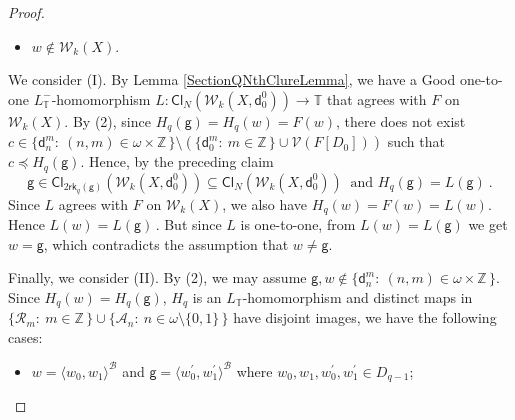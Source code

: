 \documentclass[10pt,a4paper, openany,  oldfontcommands]{memoir}
\newtheorem{open problem} [theorem] {Open Problem}
\newtheorem{open question} [theorem] {Open Question}
\begin{document}
\begin{proof}
\begin{itemize}
\item[(II)]   $  w    \not\in  \mathcal{W}_k  \left( X  \right)  $. 
\end{itemize} 
We consider (I). 
By Lemma    \ref{SectionQNthClureLemma}, 
we have a  \textsf{Good}   one-to-one  $  L_{  \mathbb{T} }^- $-homomorphism   
 $L  :    \mathsf{Cl}_N  \left(    \mathcal{W}_k  \left( X    ,  \mathsf{d}^0_0   \right)    \right)  \to  \mathbb{T} $ 
 that agrees with $F$ on   $  \mathcal{W}_k  \left( X  \right)  $.  
 By (2),  
 since  $  H_q  \left(  \mathsf{g} \right)  =  H_q  (w)  = F(w)  $, 
 there does not exist   $ c  \in  \big\{  \mathsf{d}^m_n :   \  (n, m  )  \in  \omega  \times  \mathbb{Z}  \,  \rbrace 
\setminus  \left(    \big\{  \mathsf{d}^m_0 :   \   m  \in   \mathbb{Z}  \,  \rbrace   \cup  \mathcal{V} \left(  F \left[ D_0  \right]  \right)    \right)   $ 
such that  $  c  \preceq   H_q (   \mathsf{g} )  $. 
Hence, by the preceding claim 
\[
\mathsf{g}  \in    \mathsf{Cl}_{   2  \mathsf{rk}_q  \left(   \mathsf{g}   \right)  }  \left(    \mathcal{W}_k  \left( X   ,  \mathsf{d}^0_0  \right)    \right)
\subseteq    \mathsf{Cl}_{   N }  \left(    \mathcal{W}_k  \left( X    ,  \mathsf{d}^0_0  \right)    \right)
\   \mbox{  and  }   H_q  \left(  \mathsf{g} \right)  =  L  \left(   \mathsf{g} \right) 
\    .
\]
Since  $L$ agrees with   $F$ on   $   \mathcal{W}_k  \left( X  \right)    $,  we also have  $  H_q  (w)  =  F(w)  =   L(w)  $. 
Hence  $  L(w)   =  L \left(  \mathsf{g}  \right)   \,   $.
But since  $  L  $  is one-to-one,  from    $    L(w)   =  L \left(  \mathsf{g}  \right)     $  we get 
$  w  =  \mathsf{g}  $, 
which contradicts the assumption that  $  w  \neq  \mathsf{g} $. 






Finally, we consider (II). 
By  (2),  we may assume  $  \mathsf{g} ,  w  \not\in  \big\{  \mathsf{d}^m_n  :   \   (n,m)  \in  \omega \times  \mathbb{Z} \,  \big\}   $. 
Since  $ H_q (w)  =  H_q  \left(  \mathsf{g}  \right)  $, 
$  H_q  $  is  an    $  L_{  \mathbb{T} }  $-homomorphism  
and     distinct maps in    $   \lbrace  \mathcal{R}_m   :  \   m  \in  \mathbb{Z} \,   \rbrace   \cup 
 \lbrace  \mathcal{A}_n :  \   n  \in    \omega  \setminus \lbrace 0, 1   \rbrace  \,   \rbrace       $
 have disjoint images,  we have the following cases: 
 \begin{itemize}
\item[(IIa)]   $  w  =  \langle  w_0,  w_1  \rangle^{  \mathcal{B}  }  $   and 
 $ \mathsf{g}   =  \langle   w^{  \prime  }_0,     w^{  \prime  }_1  \rangle^{  \mathcal{B}  }  $
 where  $ w_0, w_1,   w^{  \prime  }_0,   w^{  \prime  }_1  \in D_{q-1} $; 
 

\end{itemize}
\end{proof}
\end{document}
